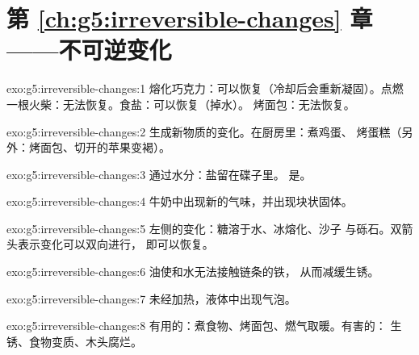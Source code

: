 \section*{第 \ref{ch:g5:irreversible-changes} 章——不可逆变化}

\begin{solution}{exo:g5:irreversible-changes:1}
熔化巧克力：可以恢复（冷却后会重新凝固）。点燃
一根火柴：无法恢复。食盐：可以恢复（掉水）。
烤面包：无法恢复。
\end{solution}

\begin{solution}{exo:g5:irreversible-changes:2}
生成新物质的变化。在厨房里：煮鸡蛋、
烤蛋糕（另外：烤面包、切开的苹果变褐）。
\end{solution}

\begin{solution}{exo:g5:irreversible-changes:3}
通过水分：盐留在碟子里。
是。
\end{solution}

\begin{solution}{exo:g5:irreversible-changes:4}
牛奶中出现新的气味，并出现块状固体。
\end{solution}

\begin{solution}{exo:g5:irreversible-changes:5}
左侧的变化：糖溶于水、冰熔化、沙子
与砾石。双箭头表示变化可以双向进行，
即可以恢复。
\end{solution}

\begin{solution}{exo:g5:irreversible-changes:6}
油使和水无法接触链条的铁，
从而减缓生锈。
\end{solution}

\begin{solution}{exo:g5:irreversible-changes:7}
未经加热，液体中出现气泡。
\end{solution}

\begin{solution}{exo:g5:irreversible-changes:8}
有用的：煮食物、烤面包、燃气取暖。有害的：
生锈、食物变质、木头腐烂。
\end{solution}

